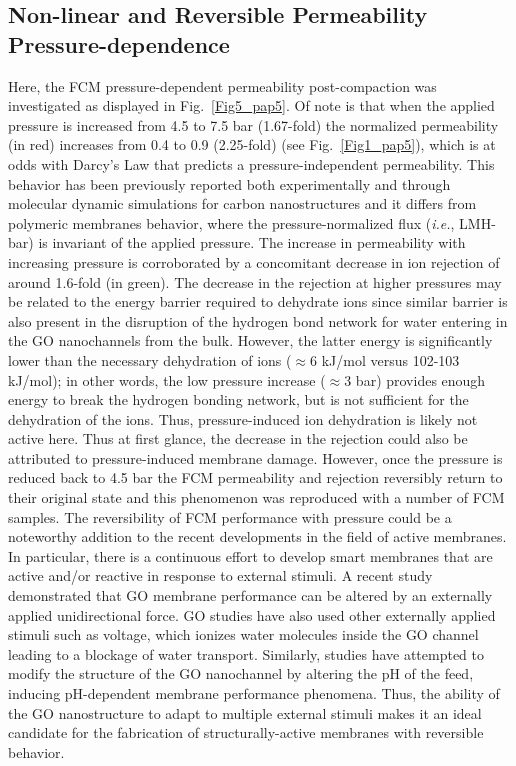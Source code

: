 \subsection{Non-linear and Reversible Permeability Pressure-dependence}
Here, the FCM pressure-dependent permeability post-compaction was investigated as displayed in Fig.~\ref{Fig5_pap5}.  Of note is that when the applied pressure is increased from 4.5 to 7.5 bar (1.67-fold) the normalized permeability (in red) increases from 0.4 to 0.9 (2.25-fold) (see Fig.~\ref{Fig1_pap5}), which is at odds with Darcy's Law that predicts a pressure-independent permeability. This behavior has been previously reported both experimentally and through molecular dynamic simulations for carbon nanostructures \cite{liu2018functionalized, nicolai2014tunable} and it differs from polymeric membranes behavior, where the pressure-normalized flux (\textit{i.e.}, LMH-bar) is invariant of the applied pressure. The increase in permeability with increasing pressure is corroborated by a concomitant decrease in ion rejection of around 1.6-fold (in green). The decrease in the rejection at higher pressures may be related to the energy barrier required to dehydrate ions since similar barrier is also present in the disruption of the hydrogen bond network for water entering in the GO nanochannels from the bulk. However, the latter energy is significantly lower than the necessary dehydration of ions ($\approx6$ kJ/mol versus 102-103 kJ/mol); in other words, the low pressure increase ($\approx3$ bar) provides enough energy to break the hydrogen bonding network, but is not sufficient for the dehydration of the ions.\cite{thomas2016computational} Thus, pressure-induced ion dehydration is likely not active here.
Thus at first glance, the decrease in the rejection could also be attributed to pressure-induced membrane damage. However, once the pressure is reduced back to 4.5 bar the FCM permeability and rejection reversibly return to their original state and this phenomenon was reproduced with a number of FCM samples. The reversibility of FCM performance with pressure could be a noteworthy addition to the recent developments in the field of active membranes. In particular, there is a continuous effort to develop smart membranes that are active and/or reactive in response to external stimuli. A recent study demonstrated that GO membrane performance can be altered by an externally applied unidirectional force.\cite{li2018controlling} GO studies have also used other externally applied stimuli such as voltage, which ionizes water molecules inside the GO channel leading to a blockage of water transport.\cite{zhou2018electrically} Similarly, studies have attempted to modify the structure of the GO nanochannel by altering the pH of the feed, inducing pH-dependent membrane performance phenomena.\cite{oh2017understanding} Thus, the ability of the GO nanostructure to adapt to multiple external stimuli makes it an ideal candidate for the fabrication of structurally-active membranes with reversible behavior.
